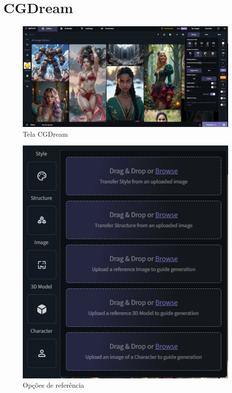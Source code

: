 \FloatBarrier
\section{CGDream}
\label{s.CGDreamApendice}

\begin{figure}[htbp]
    \centering
    \caption{\small Tela CGDream}
    \label{fig:CGDreamTela}
    \includegraphics[width=1\linewidth]{figs/cgDream/tela_analise.png}
\end{figure}

\begin{figure}[htbp]
    \centering
    \caption{\small Opções de referência}
    \label{fig:CGDreamOpcoes}
    \includegraphics[width=0.4\linewidth]{figs/cgDream/tela_opcoes.PNG}
\end{figure}

